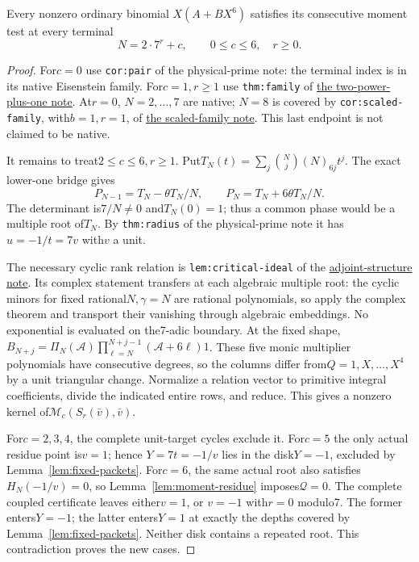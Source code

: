\documentclass[11pt]{article}
\begin{document}
\begin{theorem}\label{thm:family}
Every nonzero ordinary binomial $X(A+BX^6)$ satisfies its consecutive
moment test at every terminal
\[
                    N=2\cdot7^r+c,\qquad0\le c\le6,\quad r\ge0.
\]
\end{theorem}
\begin{proof}
For$c=0$ use \texttt{cor:pair} of the physical-prime note:
the terminal index is in its native Eisenstein family.
For$c=1,r\ge1$ use \texttt{thm:family} of
\href{GAP_SIX_TWO_POWER_PLUS_ONE_SFC.tex}{the two-power-plus-one note}.
At$r=0$, $N=2,\ldots,7$ are native; $N=8$ is covered by
\texttt{cor:scaled-family}, with$b=1,r=1$, of
\href{GAP_SIX_SCALED_POWER_PLUS_ONE_SFC.tex}{the scaled-family note}.
This last endpoint is not claimed to be native.

It remains to treat$2\le c\le6,r\ge1$.
Put$T_N(t)=\sum_j\binom Nj(N)_{6j}t^j$.
The exact lower-one bridge gives
\[
 P_{N-1}=T_N-\theta T_N/N,\qquad
 P_N=T_N+6\theta T_N/N.
\]
The determinant is$7/N\ne0$ and$T_N(0)=1$; thus a common phase
would be a multiple root of$T_N$.
By \texttt{thm:radius} of the physical-prime note it has
$u=-1/t=7v$ with$v$ a unit.

The necessary cyclic rank relation is
\texttt{lem:critical-ideal} of the
\href{gap_three_hurwitz_structure.tex}{adjoint-structure note}.
Its complex statement transfers at each algebraic multiple root:
the cyclic minors for fixed rational$N,\gamma=N$ are rational
polynomials, so apply the complex theorem and transport their
vanishing through algebraic embeddings.
No exponential is evaluated on the7-adic boundary.
At the fixed shape,
$B_{N+j}=\Pi_N(\mathcal A)
\prod_{\ell=N}^{N+j-1}(\mathcal A+6\ell)1$.
These five monic multiplier polynomials have consecutive degrees,
so the columns differ from$Q=1,X,\ldots,X^4$ by a unit
triangular change.
Normalize a relation vector to primitive integral coefficients,
divide the indicated entire rows, and reduce.
This gives a nonzero kernel of$\mathcal M_c(S_r(\bar v),\bar v)$.

For$c=2,3,4$, the complete unit-target cycles exclude it.
For$c=5$ the only actual residue point is$v=1$; hence
$Y=7t=-1/v$ lies in the disk$Y=-1$, excluded by
Lemma~\ref{lem:fixed-packets}.
For$c=6$, the same actual root also satisfies$H_N(-1/v)=0$,
so Lemma~\ref{lem:moment-residue} imposes$\mathcal Q=0$.
The complete coupled certificate leaves either$v=1$, or
$v=-1$ with$r=0$ modulo7.
The former enters$Y=-1$; the latter enters$Y=1$ at exactly
the depths covered by Lemma~\ref{lem:fixed-packets}.
Neither disk contains a repeated root.
This contradiction proves the new cases.
\end{proof}
\end{document}
